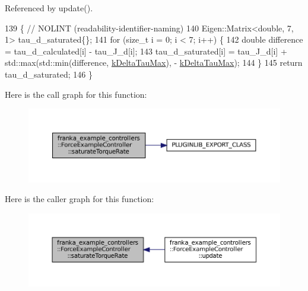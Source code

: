 Referenced by update().


\begin{DoxyCode}
139                                               \{  \textcolor{comment}{// NOLINT (readability-identifier-naming)}
140   Eigen::Matrix<double, 7, 1> tau\_d\_saturated\{\};
141   \textcolor{keywordflow}{for} (\textcolor{keywordtype}{size\_t} i = 0; i < 7; i++) \{
142     \textcolor{keywordtype}{double} difference = tau\_d\_calculated[i] - tau\_J\_d[i];
143     tau\_d\_saturated[i] = tau\_J\_d[i] + std::max(std::min(difference, \hyperlink{classfranka__example__controllers_1_1ForceExampleController_aa8d9d933646084d16500a53eea9e314c}{kDeltaTauMax}), -
      \hyperlink{classfranka__example__controllers_1_1ForceExampleController_aa8d9d933646084d16500a53eea9e314c}{kDeltaTauMax});
144   \}
145   \textcolor{keywordflow}{return} tau\_d\_saturated;
146 \}
\end{DoxyCode}
Here is the call graph for this function\+:
\nopagebreak
\begin{figure}[H]
\begin{center}
\leavevmode
\includegraphics[width=350pt]{classfranka__example__controllers_1_1ForceExampleController_ac00e2f9f34f52e96a61e9d694e09fbd7_cgraph}
\end{center}
\end{figure}
Here is the caller graph for this function\+:
\nopagebreak
\begin{figure}[H]
\begin{center}
\leavevmode
\includegraphics[width=350pt]{classfranka__example__controllers_1_1ForceExampleController_ac00e2f9f34f52e96a61e9d694e09fbd7_icgraph}
\end{center}
\end{figure}
\mbox{\label{classfranka__example__controllers_1_1ForceExampleController_aaf7bd3ab431911c818d1c3bf312f4f02}} 
